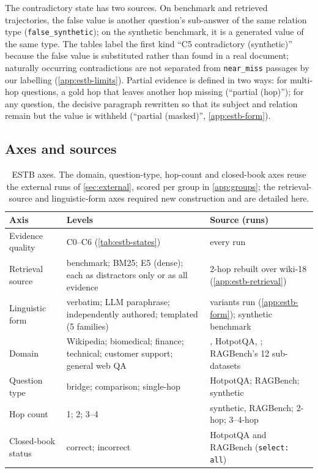 The contradictory state has two sources. On benchmark and retrieved trajectories, the false value is another question's sub-answer of the same relation type (\texttt{false\_synthetic}); on the synthetic benchmark, it is a generated value of the same type. The tables label the first kind ``C5 contradictory (synthetic)'' because the false value is substituted rather than found in a real document; naturally occurring contradictions are not separated from \texttt{near\_miss} passages by our labelling (\cref{app:estb-limits}). Partial evidence is defined in two ways: for multi-hop questions, a gold hop that leaves another hop missing (``partial (hop)''); for any question, the decisive paragraph rewritten so that its subject and relation remain but the value is withheld (``partial (masked)'', \cref{app:estb-form}).

\subsection{Axes and sources}
\label{app:estb-axes}

\begin{table}[t]
\centering\scriptsize
\setlength{\tabcolsep}{3pt}
\begin{tabular}{lp{4.1cm}p{6.1cm}}
\toprule
Axis & Levels & Source (runs) \\
\midrule
Evidence quality & C0--C6 (\cref{tab:estb-states}) & every run \\
Retrieval source & benchmark; BM25; E5 (dense); each as distractors only or as all evidence & \musique{} 2-hop rebuilt over wiki-18 (\cref{app:estb-retrieval}) \\
Linguistic form & verbatim; LLM paraphrase; independently authored; templated (5 families) & \musique{} variants run (\cref{app:estb-form}); synthetic benchmark \\
Domain & Wikipedia; biomedical; finance; technical; customer support; general web QA & \musique{}, HotpotQA, \twowiki{}; RAGBench's 12 sub-datasets \\
Question type & bridge; comparison; single-hop & HotpotQA; RAGBench; synthetic \\
Hop count & 1; 2; 3--4 & synthetic, RAGBench; \musique{} 2-hop; \musique{} 3--4-hop \\
Closed-book status & correct; incorrect & HotpotQA and RAGBench (\texttt{select: all}) \\
\bottomrule
\end{tabular}
\caption{ESTB axes. The domain, question-type, hop-count and closed-book axes reuse the external runs of \cref{sec:external}, scored per group in \cref{app:groups}; the retrieval-source and linguistic-form axes required new construction and are detailed here.}
\label{tab:estb-axes}
\end{table}


